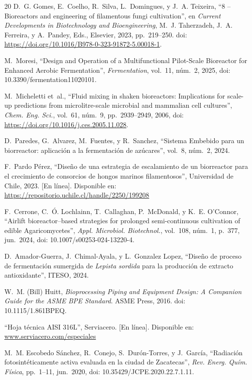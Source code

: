 \begin{thebibliography}{20}
D.~G. Gomes, E.~Coelho, R.~Silva, L.~Domingues, y J.~A. Teixeira, ``8 -- Bioreactors and engineering of filamentous fungi cultivation'', en \textit{Current Developments in Biotechnology and Bioengineering}, M.~J. Taherzadeh, J.~A. Ferreira, y A.~Pandey, Eds., Elsevier, 2023, pp.~219--250. doi: \url{https://doi.org/10.1016/B978-0-323-91872-5.00018-1}.

M.~Moresi, ``Design and Operation of a Multifunctional Pilot-Scale Bioreactor for Enhanced Aerobic Fermentation'', \textit{Fermentation}, vol.~11, núm.~2, 2025, doi: 10.3390/fermentation11020101.

M.~Micheletti et~al., ``Fluid mixing in shaken bioreactors: Implications for scale-up predictions from microlitre-scale microbial and mammalian cell cultures'', \textit{Chem. Eng. Sci.}, vol.~61, núm.~9, pp.~2939--2949, 2006, doi: \url{https://doi.org/10.1016/j.ces.2005.11.028}.

D.~Paredes, G.~Alvarez, M.~Fuentes, y R.~Sanchez, ``Sistema Embebido para un biorreactor: aplicación a la fermentación de azúcares'', vol.~8, núm.~2, 2024.

F.~Pardo Pérez, ``Diseño de una estrategia de escalamiento de un biorreactor para el crecimiento de consorcios de hongos marinos filamentosos'', Universidad de Chile, 2023. [En línea]. Disponible en: \url{https://repositorio.uchile.cl/handle/2250/199208}

F.~Cerrone, C.~Ó. Lochlainn, T.~Callaghan, P.~McDonald, y K.~E. O'Connor, ``Airlift bioreactor--based strategies for prolonged semi-continuous cultivation of edible Agaricomycetes'', \textit{Appl. Microbiol. Biotechnol.}, vol.~108, núm.~1, p.~377, jun.~2024, doi: 10.1007/s00253-024-13220-4.

D.~Amador-Guerra, J.~Chimal-Ayala, y L.~Gonzalez Lopez, ``Diseño de proceso de fermentación sumergida de \textit{Lepista sordida} para la producción de extracto antioxidante'', ITESO, 2024.

W.~M. (Bill) Huitt, \textit{Bioprocessing Piping and Equipment Design: A Companion Guide for the ASME BPE Standard}. ASME Press, 2016. doi: 10.1115/1.861BPEQ.

``Hoja técnica AISI 316L'', Serviacero. [En línea]. Disponible en: \url{www.serviacero.com/especiales}

M.~M. Escobedo Sánchez, R.~Conejo, S.~Durón-Torres, y J.~García, ``Radiación fotosintéticamente activa evaluada en la ciudad de Zacatecas'', \textit{Rev. Energ. Quím. Física}, pp.~1--11, jun.~2020, doi: 10.35429/JCPE.2020.22.7.1.11.


\end{thebibliography}
